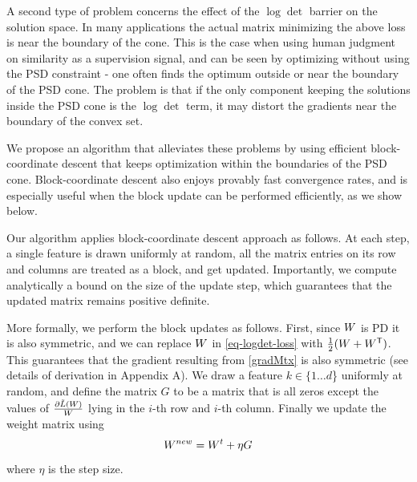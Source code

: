 \documentclass{article}
\begin{document}
A second type of problem concerns the effect of the $\log \det$ barrier on the solution space. In many applications the actual matrix minimizing the above loss is near the boundary of the cone. This is the case when using human judgment on similarity as a supervision signal, and can be seen by optimizing without using the PSD constraint - one often finds the optimum outside or near the boundary of the PSD cone.
The problem is that if the only component keeping the solutions inside the PSD cone is the $\log \det$ term, it may distort the gradients near the boundary of the convex set. 

We propose an algorithm that alleviates these problems by using efficient block-coordinate descent that keeps optimization within the boundaries of the PSD cone.
Block-coordinate descent also enjoys provably fast convergence rates, and is especially useful when the block update can be performed efficiently, as we show below.

Our algorithm applies block-coordinate descent approach as follows.
At each step, a single feature is drawn uniformly at random, all the matrix entries on its row and columns are treated as a block, and get updated. Importantly, we compute analytically a bound on the size of the update step, which guarantees that the updated matrix remains positive definite.

More formally, we perform the block updates as follows. First, since ${W}$ is PD it is also symmetric, and we can replace ${W}$ in \eqref{eq-logdet-loss} with $\tfrac{1}{2}({W} + {W}{}^\mathsf{T})$.  This guarantees that the gradient resulting from \eqref{gradMtx} is also symmetric (see details of derivation in Appendix A). We draw a feature $k \in \{1 \ldots d$\} uniformly at random, and define the matrix $G$ to be a matrix that is all zeros except the values of $\frac{\partial \tilde{L}({W})}{{W}}$ lying in the $i$-th row and $i$-th column. Finally we update the weight matrix using 
\begin{equation}
    {{W^{new}}} = {W}^t +\eta G
\label{updateEq}
\end{equation}
where $\eta$ is the step size.
\end{document}
